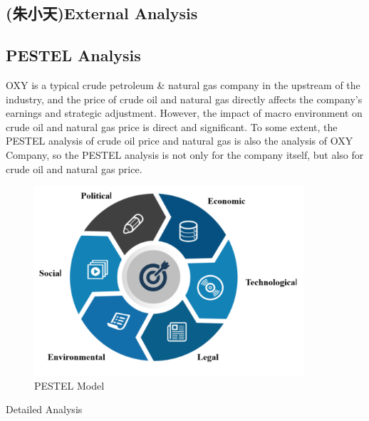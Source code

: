 \documentclass[
	a4paper, %
	12pt,%
]{CSSullivanBusinessReport}
\begin{document}
\begin{fullwidth}
\section{(朱小天)External Analysis}
\subsection{PESTEL Analysis}
OXY is a typical crude petroleum \& natural gas company in the upstream of the industry, and the price of crude oil and natural gas directly affects the company's earnings and strategic adjustment. However, the impact of macro environment on crude oil and natural gas price is direct and significant. To some extent, the PESTEL analysis of crude oil price and natural gas is also the analysis of OXY Company, so the PESTEL analysis is not only for the company itself, but also for crude oil and natural gas price.
\begin{figure}[h]
    \centering
    \includegraphics[width=10cm]{Images/PESTEL.png}
    \caption{PESTEL Model}
    \label{pestel}
\end{figure}
Detailed Analysis
\par


\end{fullwidth}
\end{document}
